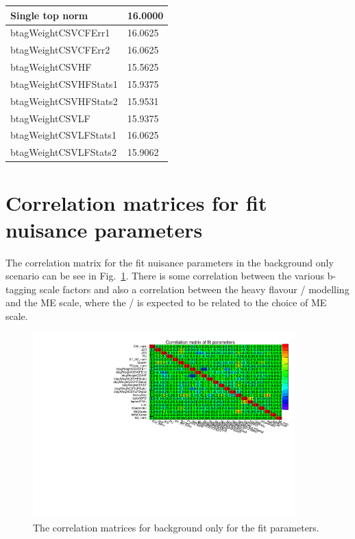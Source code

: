 \begin{table}[ht]
\begin{tabular}{|l|l|}
Single top norm                & 16.0000                                                         \\ \hline
btagWeightCSVCFErr1            & 16.0625                                                         \\ \hline
btagWeightCSVCFErr2            & 16.0625                                                         \\ \hline
btagWeightCSVHF                & 15.5625                                                         \\ \hline
btagWeightCSVHFStats1          & 15.9375                                                         \\ \hline
btagWeightCSVHFStats2          & 15.9531                                                         \\ \hline
btagWeightCSVLF                & 15.9375                                                         \\ \hline
btagWeightCSVLFStats1          & 16.0625                                                         \\ \hline
btagWeightCSVLFStats2          & 15.9062                                                         \\ \hline
\end{tabular}
\end{table}


\section{Correlation matrices for fit nuisance parameters \label{app:corrFit}}


The correlation matrix for the fit nuisance parameters in the background only scenario can be see in Fig.~\ref{fig:FitCorr}. There is some correlation between the various b-tagging scale factors and also a correlation between the heavy flavour \heavyflavourone / \heavyflavourtwo modelling and the \ttbar ME scale, where the \heavyflavourone / \heavyflavourtwo is expected to be related to the choice of ME scale.

\begin{figure}[ht!]
    \includegraphics[width=0.9\textwidth]{images/Run2/FitCorr.pdf}
    \caption{The correlation matrices for background only for the fit parameters.}
    \label{fig:FitCorr}
\end{figure}
